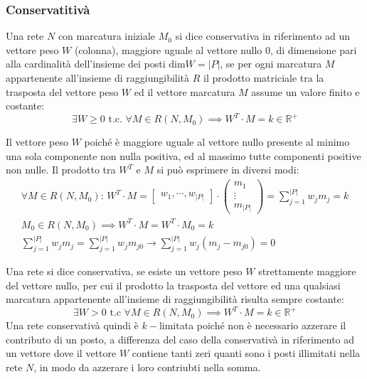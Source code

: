 \documentclass{article}
\numberwithin{equation}{subsection}
\begin{document}
\subsubsection{Conservatitivà}

Una rete $N$ con marcatura iniziale $M_0$ si dice conservativa in riferimento ad un vettore peso $W$ (colonna), maggiore uguale al vettore nullo $0$, di dimensione pari alla 
cardinalità dell'insieme dei posti $\mbox{dim} W=|P|$, se per ogni marcatura $M$ appartenente all'insieme di raggiungibilità $R$ il prodotto matriciale tra la trasposta del 
vettore peso $W$ ed il vettore marcatura $M$ assume un valore finito e costante:
\begin{equation*}
    \exists W\geq0\mbox{ t.c. }\forall M\in R(N,M_0)\implies W^T\cdot M=k\in\mathbb{R}^+
\end{equation*}


Il vettore peso $W$ poiché è maggiore uguale al vettore nullo presente al minimo una sola componente non nulla positiva, ed al massimo tutte componenti positive non nulle. Il 
prodotto tra $W^T$ e $M$ si può esprimere in diversi modi:
\begin{gather*}
    \forall M\in R(N,M_0):\,W^T\cdot M=\begin{bmatrix}
        w_1,\cdots,w_{|P|}
    \end{bmatrix}\cdot\begin{pmatrix}
        m_1\\
        \vdots\\
        m_{|P|}
    \end{pmatrix}=\displaystyle\sum_{j=1}^{|P|}w_jm_j=k\\
    M_0\in R(N,M_0)\implies W^T\cdot M=W^T\cdot M_0=k\\
    \displaystyle\sum_{j=1}^{|P|}w_jm_j=\sum_{j=1}^{|P|}w_jm_{j0}\to \sum_{j=1}^{|P|}w_j(m_j-m_{j0})=0
\end{gather*}


Una rete si dice conservativa, se esiste un vettore peso $W$ strettamente maggiore del vettore nullo, per cui il prodotto la trasposta del vettore ed una qualsiasi marcatura 
appartenente all'insieme di raggiungibilità risulta sempre costante:
\begin{equation*}
    \exists W>0\mbox{ t.c }\forall M\in R(N,M_0)\implies W^T\cdot M=k\in\mathbb{R}^+
\end{equation*}
Una rete conservativà quindi è $k-$limitata poiché non è necessario azzerare il contributo di un posto, a differenza del caso della conservativà in riferimento ad un vettore 
dove il vettore $W$ contiene tanti zeri quanti sono i posti illimitati nella rete $N$, in modo da azzerare i loro contriubti nella somma. 
\end{document}
